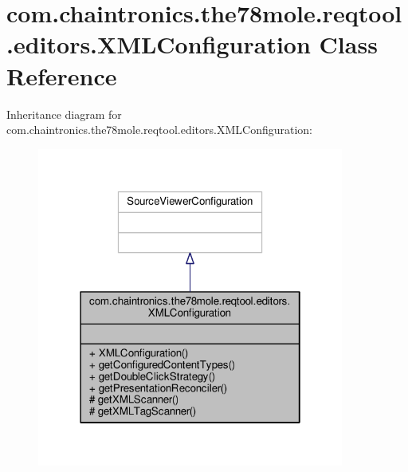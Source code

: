 \hypertarget{classcom_1_1chaintronics_1_1the78mole_1_1reqtool_1_1editors_1_1XMLConfiguration}{}\section{com.\+chaintronics.\+the78mole.\+reqtool.\+editors.\+X\+M\+L\+Configuration Class Reference}
\label{classcom_1_1chaintronics_1_1the78mole_1_1reqtool_1_1editors_1_1XMLConfiguration}


Inheritance diagram for com.\+chaintronics.\+the78mole.\+reqtool.\+editors.\+X\+M\+L\+Configuration\+:\nopagebreak
\begin{figure}[H]
\begin{center}
\leavevmode
\includegraphics[width=286pt]{d1/dc0/classcom_1_1chaintronics_1_1the78mole_1_1reqtool_1_1editors_1_1XMLConfiguration__inherit__graph}
\end{center}
\end{figure}


